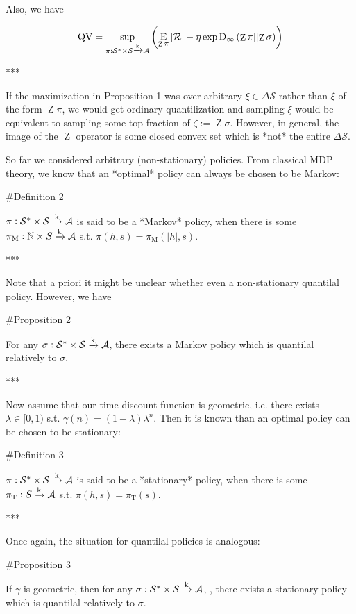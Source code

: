 \documentclass[a4paper]{article}
\newcommand{\Comment}[1]{}
\newcommand{\AP}[1]{\left(#1\right)}
\newcommand{\AB}[1]{\left[#1\right]}
\newcommand{\Ea}[2]{\underset{#1}{\operatorname{E}}\AB{#2}}
\newcommand{\RD}[3]{\operatorname{D}_{#1}\AP{#2\middle\vert\middle\vert#3}}
\newcommand{\Nats}{\mathbb{N}}
\newcommand{\Abs}[1]{\left\vert #1 \right\vert}
\newcommand{\K}{\xrightarrow{\textnormal{k}}}
\newcommand{\A}{\mathcal{A}}
\newcommand{\St}{\mathcal{S}}
\newcommand{\R}{\mathcal{R}}
\newcommand{\QV}{\operatorname{QV}}
\DeclareMathOperator{\Z}{Z}
\begin{document}
Also, we have

$$\QV = \sup_{\pi: \St^*\times\St \K \A}\AP{\Ea{\Z{\pi}}{\R}-\eta \exp{\RD{\infty}{\Z{\pi}}{\Z{\sigma}}}}$$

***

If the maximization in Proposition 1 was over arbitrary $\xi \in \Delta\St$ rather than $\xi$ of the form $\Z{\pi}$, we would get ordinary quantilization and sampling $\xi$ would be equivalent to sampling some top fraction of $\zeta:=\Z{\sigma}$. However, in general, the image of the $\Z$ operator is some closed convex set which is *not* the entire $\Delta\St$.  \Comment{Also, Proposition 1 shows that quantilality only depends on $\sigma$ via $\zeta$. In the following, we will say that $\pi$ is quantilal relatively to $\zeta\in\Delta\St$ when it satisfies the property given in Proposition 1 with $\Z{\sigma}$ replaced by $\zeta$.}

So far we considered arbitrary (non-stationary) policies. From classical MDP theory, we know that an *optimal* policy can always be chosen to be Markov:

\#Definition 2

$\pi: \St^* \times \St \K \A$ is said to be a *Markov* policy, when there is some $\pi_\text{M}: \Nats \times S \K \A$ s.t. $\pi(h,s)=\pi_\text{M}\AP{\Abs{h},s}$.

***

Note that a priori it might be unclear whether even a non-stationary quantilal policy. However, we have

\#Proposition 2

For any $\sigma: \St^* \times \St \K \A$, there exists a Markov policy which is quantilal relatively to $\sigma$.

***

Now assume that our time discount function is geometric, i.e. there exists $\lambda\in[0,1)$ s.t. $\gamma(n)=(1-\lambda)\lambda^n$. Then it is known than an optimal policy can be chosen to be stationary:

\#Definition 3

$\pi: \St^* \times \St \K \A$ is said to be a *stationary* policy, when there is some $\pi_\text{T}: S \K \A$ s.t. $\pi(h,s)=\pi_\text{T}\AP{s}$.

***

Once again, the situation for quantilal policies is analogous:

\#Proposition 3

If $\gamma$ is geometric, then for any $\sigma: \St^* \times \St \K \A$, , there exists a stationary policy which is quantilal relatively to $\sigma$.
\end{document}
